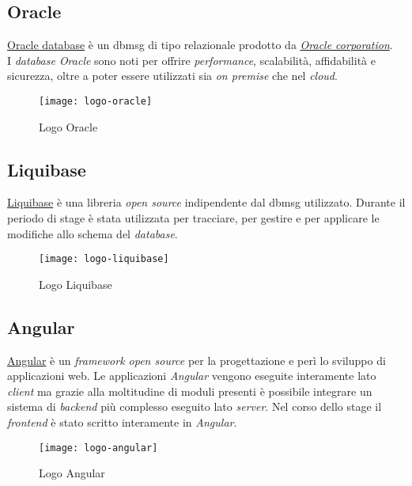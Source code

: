 \subsection{Oracle}
\label{oracle}
\href{https://www.oracle.com/it/database/}{Oracle database} è un \gls{dbmsg} di tipo relazionale prodotto da \textit{\href{https://www.oracle.com/}{Oracle corporation}}. 
\\I \textit{database Oracle} sono noti per offrire \textit{performance}, scalabilità, affidabilità e sicurezza, oltre a poter essere utilizzati sia \textit{on premise} che nel \textit{cloud}.
\begin{figure}[h]
    \begin{center}
    \texttt{[image: logo-oracle]}
    \caption{Logo Oracle}
    \label{fig:figure7}
    \end{center}
\end{figure}

\subsection{Liquibase}
\href{https://www.liquibase.org/}{Liquibase} è una libreria \textit{open source} indipendente dal \gls{dbmsg} utilizzato. Durante il periodo di stage è stata utilizzata per tracciare, per gestire e per applicare le modifiche allo schema del \textit{database}.
\begin{figure}[h]
    \begin{center}
    \texttt{[image: logo-liquibase]}
    \caption{Logo Liquibase}
    \label{fig:figure8}
    \end{center}
\end{figure}
\newpage
\subsection{Angular}
\href{https://angular.io/}{Angular} è un \textit{framework open source} per la progettazione e perì lo sviluppo di applicazioni web.
Le applicazioni \textit{Angular} vengono eseguite interamente lato \textit{client} ma grazie alla moltitudine di moduli presenti è possibile integrare un sistema di \textit{backend} più complesso eseguito lato \textit{server}.
Nel corso dello stage il \textit{frontend} è stato scritto interamente in \textit{Angular}.
\begin{figure}[h]
    \begin{center}
    \texttt{[image: logo-angular]}
    \caption{Logo Angular}
    \label{fig:figure9}
    \end{center}
\end{figure}

